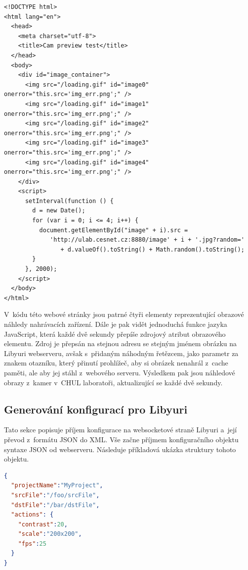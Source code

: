 \documentclass[thesis=M,czech]{FITthesis}[2012/06/26]
\begin{document}
\begin{lstlisting}[style=htmlcssjs]
<!DOCTYPE html>
<html lang="en">
  <head>
    <meta charset="utf-8">
    <title>Cam preview test</title>
  </head>
  <body>
    <div id="image_container">
      <img src="/loading.gif" id="image0" onerror="this.src='img_err.png';" />
      <img src="/loading.gif" id="image1" onerror="this.src='img_err.png';" />
      <img src="/loading.gif" id="image2" onerror="this.src='img_err.png';" />
      <img src="/loading.gif" id="image3" onerror="this.src='img_err.png';" />
      <img src="/loading.gif" id="image4" onerror="this.src='img_err.png';" />
    </div>
    <script>
      setInterval(function () {
        d = new Date();
        for (var i = 0; i <= 4; i++) {
          document.getElementById("image" + i).src = 
             'http://ulab.cesnet.cz:8880/image' + i + '.jpg?random='
                + d.valueOf().toString() + Math.random().toString();
        }
      }, 2000);
    </script>
  </body>
</html>
\end{lstlisting}

V~kódu této webové stránky jsou patrné čtyři elementy  reprezentující obrazové náhledy nahrávacích zařízení. Dále je pak vidět jednoduchá funkce jazyka JavaScript, která každé dvě sekundy přepíše zdrojový atribut obrazového elementu. Zdroj je přepsán na stejnou adresu se stejným jménem obrázku na Libyuri webserveru, avšak s~přidaným náhodným řetězcem, jako parametr za znakem otazníku, který přinutí prohlížeč, aby si obrázek nenahrál z~cache paměti, ale aby jej stáhl z~webového serveru. Výsledkem pak jsou náhledové obrazy z~kamer v~CHUL laboratoři, aktualizující se každé dvě sekundy.


\subsection{Generování konfigurací pro Libyuri} \label{subsec:impl_funkce_generate}
Tato sekce popisuje příjem konfigurace na websocketové straně Libyuri a~její převod z~formátu JSON do XML. Vše začne příjmem konfiguračního objektu syntaxe JSON od webserveru. Následuje příkladová ukázka struktury tohoto objektu.\\

\begin{lstlisting}[language=json]
{
  "projectName":"MyProject",
  "srcFile":"/foo/srcFile",
  "dstFile":"/bar/dstFile",
  "actions": {
    "contrast":20,
    "scale":"200x200",
    "fps":25
  }
}
\end{lstlisting}
\end{document}
